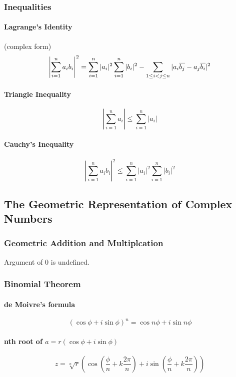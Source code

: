 \subsubsection{Inequalities}
\paragraph{Lagrange's Identity}(complex form)
\begin{equation}
	\left| \sum_{i=1}^n a_ib_i \right|^2 = \sum_{i=1}^n|a_i|^2\sum_{i=1}^n |b_i|^2 - \sum_{1 \le i < j \le n} |a_i\overline{b_j} - a_j\overline{b_i}|^2
\end{equation}
\paragraph{Triangle Inequality}
\begin{equation}
	\left| \sum_{i=1}^n a_i \right| \le \sum_{i=1}^n |a_i|
\end{equation}
\paragraph{Cauchy's Inequality}
\begin{equation}
	\left| \sum_{i=1}^n a_ib_i \right|^2 \le \sum_{i=1}^n |a_i|^2 \sum_{i=1}^n |b_i|^2
\end{equation}

\subsection{The Geometric Representation of Complex Numbers}
\subsubsection{Geometric Addition and Multiplcation}
\begin{important}
	Argument of $0$ is undefined.
\end{important}
\subsubsection{Binomial Theorem}
\paragraph{de Moivre's formula}
\begin{equation}
	(\cos \phi+i\sin \phi)^n = \cos n\phi + i \sin n\phi
\end{equation}
\paragraph{nth root of $a = r(\cos \phi+i\sin \phi)$}
\begin{equation}
	z = \sqrt[n]{r} \left(\cos \left(\frac{\phi}{n}+k\frac{2\pi}{n}\right) + i\sin\left(\frac{\phi}{n} + k\frac{2\pi}{n}\right) \right)
\end{equation}

